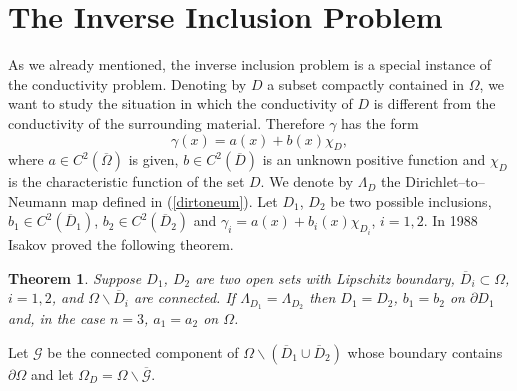 \documentclass[10pt, a4paper, twoside, openright]{book}
\theoremstyle{definition}
\theoremstyle{plain}
\newtheorem{theorem}[subsection]{Theorem}
\theoremstyle{plain}
\theoremstyle{plain}
\theoremstyle{plain}
\theoremstyle{plain}
\theoremstyle{plain}
\theoremstyle{plain}
\theoremstyle{plain}
\begin{document}
\section{The Inverse Inclusion Problem}
\label{incluniq}
As we already mentioned, the inverse inclusion problem is a special instance of the conductivity problem.
Denoting by $D$ a subset compactly contained in $\Omega$, we want to study the situation in which the
conductivity of $D$ is different from the conductivity of the surrounding material. Therefore $\gamma$ has the form
$$\gamma(x)=a(x)+b(x)\chi_D,$$
where $a\in C^2(\overline{\Omega})$ is given, $b\in C^2(\overline{D})$
is an unknown positive function
and $\chi_D$ is the characteristic function of the set $D$.
We denote by $\Lambda_D$ the Dirichlet--to--Neumann map
defined in (\ref{dirtoneum}).
Let $D_1$, $D_2$ be two possible inclusions,
$b_1\in C^2(\overline{D}_1)$, $b_2\in C^2(\overline{D}_2)$
and $\gamma_i=a(x)+b_i(x)\chi_{D_i}$, $i=1,2$.
In 1988 Isakov \cite{Is88} proved the following theorem.
\begin{theorem}
\label{isuniq}
Suppose $D_1$, $D_2$ are two open sets with Lipschitz boundary,
$\overline{D}_i\subset\Omega$, $i=1,2$,
 and $\Omega\smallsetminus\overline{D}_i$ are connected.
If $\Lambda_{D_1}=\Lambda_{D_2}$ then
$D_1=D_2$,
$b_1=b_2$ on $\partial D_1$ and, in the case $n=3$,
$a_1=a_2$ on $\Omega$.
\end{theorem}

Let $\mathcal{G}$ be the connected component of
$\Omega\smallsetminus(\overline{D}_1\cup\overline{D}_2)$ whose boundary
contains
$\partial\Omega$ and let $\Omega_D=\Omega\smallsetminus\overline{\mathcal{G}}$.
\end{document}
